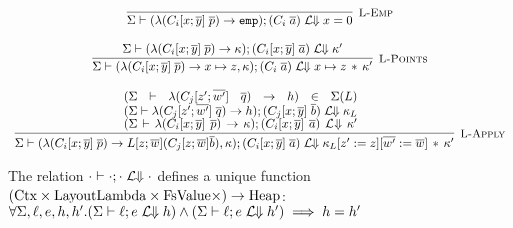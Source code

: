 \documentclass[10pt]{article}
\begin{document}
\[
  \begin{array}{c}
    \labinfer[L-Emp]{\Sigma \vdash (\lambda (C_i[x;\overline{y}]\; \overline{p}) \ra \emp); (C_i\; \overline{a}) \Lbigs x = 0}{}
    \\\\
    \labinfer[L-Points]{\Sigma \vdash (\lambda (C_i[x;\overline{y}]\; \overline{p}) \ra x \pointsto z, \kappa); (C_i\; \overline{a}) \Lbigs x \pointsto z \sep \kappa'}
      {\Sigma \vdash (\lambda (C_i[x;\overline{y}]\; \overline{p}) \ra \kappa); (C_i[x;\overline{y}]\; \overline{a}) \Lbigs \kappa'}
    \\\\
    \labinfer[L-Apply]{\Sigma \vdash (\lambda (C_i[x;\overline{y}]\; \overline{p}) \ra L[z;\overline{w}] (C_j[z;\overline{w}] \overline{b}), \kappa); (C_i[x;\overline{y}]\; \overline{a})
            \Lbigs \kappa_L[z':=z][\overline{w'}:=\overline{w}] \sep \kappa'}
      {
      & (\Sigma \vdash \lambda (C_j[z';\overline{w'}]\; \overline{q}) \ra h) \in \Sigma(L) \\
      & (\Sigma \vdash \lambda (C_j[z';\overline{w'}]\; \overline{q}) \ra h); (C_j[x;\overline{y}]\; \overline{b}) \Lbigs \kappa_L \\
      & (\Sigma \vdash \lambda (C_i[x;\overline{y}]\; \overline{p}) \ra \kappa); (C_i[x;\overline{y}]\; \overline{a}) \Lbigs \kappa'
      }
  \end{array}
\]



\begin{lemma}
  The relation $\cdot \vdash \cdot; \cdot\;\mathcal{L}\!\!\Downarrow\cdot$ defines a unique function $(\textnormal{Ctx} \times \textnormal{LayoutLambda} \times \textnormal{FsValue} \times) \rightarrow \textnormal{Heap}$:\\
  $\forall \Sigma, \ell, e, h, h'. (\Sigma \vdash \ell;e \;\mathcal{L}\!\!\Downarrow h) \land (\Sigma \vdash \ell;e \;\mathcal{L}\!\!\Downarrow h') \implies h = h'$
\end{lemma}
\end{document}
